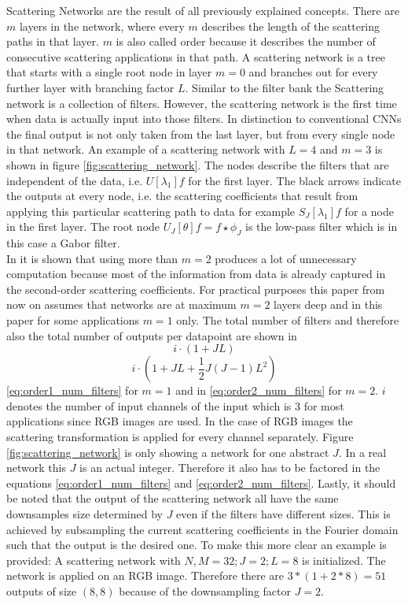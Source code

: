 Scattering Networks are the result of all previously explained concepts. There are $m$ layers in the network, where every $m$ describes the length of the scattering paths in that layer. $m$ is also called order because it describes the number of consecutive scattering applications in that path. A scattering network is a tree that starts with a single root node in layer $m=0$ and branches out for every further layer with branching factor $L$. Similar to the filter bank the Scattering network is a collection of filters. However, the scattering network is the first time when data is actually input into those filters. In distinction to conventional CNNs the final output is not only taken from the last layer, but from every single node in that network. An example of a scattering network with $L=4$ and $m=3$ is shown in figure \ref{fig:scattering_network}. The nodes describe the filters that are independent of the data, i.e. $U[\lambda_1]f$ for the first layer. The black arrows indicate the outputs at every node, i.e. the scattering coefficients that result from applying this particular scattering path to data for example $S_J[\lambda_1]f$ for a node in the first layer. The root node $U_J[\theta]f = f \star \phi_J$ is the low-pass filter which is in this case a Gabor filter. \\
In \cite{scatteringTransform2012} it is shown that using more than $m=2$ produces a lot of unnecessary computation because most of the information from data is already captured in the second-order scattering coefficients. For practical purposes this paper from now on assumes that networks are at maximum $m=2$ layers deep and in this paper for some applications $m=1$ only. 
The total number of filters and therefore also the total number of outputs per datapoint are shown in 
\begin{equation}
	i \cdot (1 + JL) 
	\label{eq:order1_num_filters}
\end{equation} 
\begin{equation}
	i \cdot (1 + JL + \frac{1}{2}J(J-1)L^2)
	\label{eq:order2_num_filters}
\end{equation}
\ref{eq:order1_num_filters} for $m=1$ and in \ref{eq:order2_num_filters} for $m=2$. $i$ denotes the number of input channels of the input which is 3 for most applications since RGB images are used. In the case of RGB images the scattering transformation is applied for every channel separately. Figure \ref{fig:scattering_network} is only showing a network for one abstract $J$. In a real network this $J$ is an actual integer. Therefore it also has to be factored in the equations \ref{eq:order1_num_filters} and \ref{eq:order2_num_filters}. Lastly, it should be noted that the output of the scattering network all have the same downsamples size determined by $J$ even if the filters have different sizes. This is achieved by subsampling the current scattering coefficients in the Fourier domain such that the output is the desired one. To make this more clear an example is provided: A scattering network with $N,M = 32; J=2; L=8$ is initialized. The network is applied on an RGB image. Therefore there are $3*(1+2*8) = 51$ outputs of size $(8,8)$ because of the downsampling factor $J=2$. 
